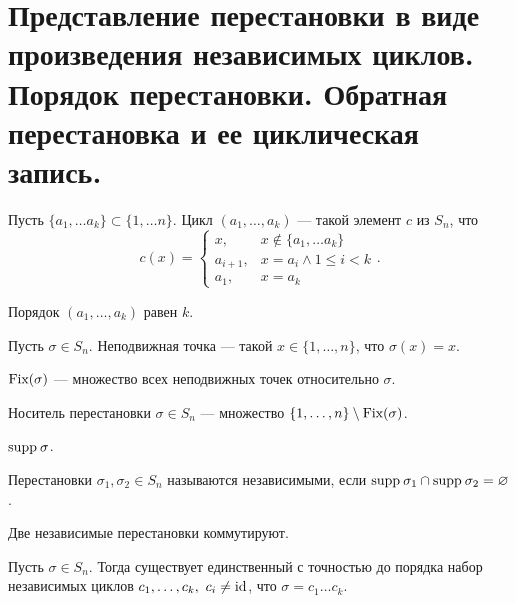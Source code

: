 % 
% 
\section{Представление перестановки в виде произведения независимых циклов. Порядок перестановки. Обратная перестановка и ее циклическая запись.}
\begin{defn}[Цикл]
    Пусть  $ \{a_1, \ldots a_k\} \subset \{1, \ldots n\}$.
    {\sf Цикл} $ (a_1, \ldots , a_k)$ --- такой элемент $ c $ из  $ S_n$, что  
    \[
	c(x) =
	\begin{cases}
	    x, & x \not\in \{a_1, \ldots a_k\}\\
	    a_{i+1}, & x = a_i \wedge 1 \le i < k\\
	    a_1, & x = a_k
	\end{cases}
    .\] 
    \begin{note}
	Порядок $ (a_1, \ldots , a_k)$ равен $ k$.
    \end{note}
\end{defn}
\begin{defn}
    Пусть $ \sigma \in S_{n}$. {\sf Неподвижная точка} --- такой $ x \in \{1, \ldots , n\}$, что $ \sigma (x) = x$. 
    \begin{name}
	$ {\mathop{\text{\rm Fix}}}(\sigma ) $ --- множество всех неподвижных точек относительно $ \sigma $.  
    \end{name}
\end{defn}
\begin{defn}[Носитель]
    {\sf Носитель перестановки $ \sigma \in  S_{n} $} --- множество $ \{1, \ldots , n\} \setminus {\mathop{\text{\rm Fix}}}( \sigma )$.  
    \begin{name}
        $ {\mathop{\text{\rm supp}}}\: \sigma $.
    \end{name}
\end{defn}
\begin{defn}
    Перестановки $\sigma _1 , \sigma _2 \in S_{n} $ называются {\sf независимыми}, если $ {\mathop{\text{\rm supp}}}\: \sigma _1 \cap {\mathop{\text{\rm supp}}}\: \sigma _2 = \varnothing$.  
    \begin{prop}
        Две независимые перестановки коммутируют.
    \end{prop}
\end{defn}
\begin{thm}
    Пусть $ \sigma \in S_{n} $. Тогда существует единственный с точностью до порядка набор независимых циклов $ c_1, \ldots , c_k, ~ c_i \ne {\mathop{\text{\rm id}}}$, что $ \sigma  = c_1  \ldots c_k$.
\end{thm}
